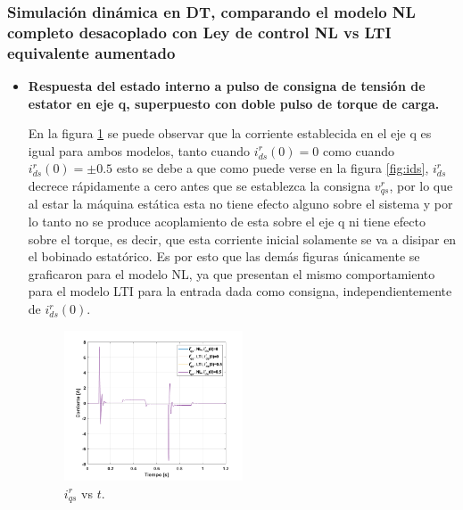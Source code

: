 \documentclass[10pt]{article}
\begin{document}
\subsubsection{Simulación dinámica en DT, comparando el modelo NL completo desacoplado con Ley de control
NL vs LTI equivalente aumentado}
\begin{itemize}

\item \textbf{Respuesta del estado interno a pulso de consigna de tensión de estator en eje q, superpuesto con doble pulso de torque de carga.}
	
	En la figura \ref{fig:iq_LTIvsNL} se puede observar que la corriente establecida en el eje q es igual para ambos modelos, tanto cuando $i^{r}_{ds}(0)=0$ como cuando $i^{r}_{ds}(0)=\pm 0.5$ esto se debe a que como puede verse en la figura \ref{fig:ids}, $i^{r}_{ds}$ decrece rápidamente a cero antes que se establezca la consigna $v^{r}_{qs}$, por lo que al estar la máquina estática esta no tiene efecto alguno sobre el sistema y por lo tanto no se produce acoplamiento de esta sobre el eje q ni tiene efecto sobre el torque, es decir, que esta corriente inicial solamente se va a disipar en el bobinado estatórico.
	Es por esto que las demás figuras únicamente se graficaron para el modelo NL, ya que presentan el mismo comportamiento para el modelo LTI para la entrada dada como consigna, independientemente de $i^{r}_{ds}(0)$.\\
			\begin{figure}[h!]
	\centering
	\includegraphics[width=0.5\textwidth]{iq_LTIvsNL.png}
	\caption{\label{fig:iq_LTIvsNL} $i^{r}_{qs}$ vs $t$.}
	\end{figure}
		


\end{itemize}
\end{document}
